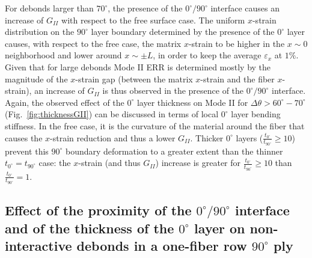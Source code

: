 \documentclass[review]{elsarticle}
\begin{document}
For debonds larger than $70^{\circ}$, the presence of the $0^{\circ}/90^{\circ}$ interface causes an increase of $G_{II}$ with respect to the free surface case. The uniform $x$-strain distribution on the $90^{\circ}$ layer boundary determined by the presence of the $0^{\circ}$ layer causes, with respect to the free case, the matrix $x$-strain to be higher in the $x\sim0$ neighborhood and lower around $x\sim\pm L$, in order to keep the average $\varepsilon_{x}$ at $1\%$. Given that for large debonds Mode II ERR is determined mostly by the magnitude of the $x$-strain gap (between the matrix $x$-strain and the fiber $x$-strain), an increase of $G_{II}$ is thus observed in the presence of the $0^{\circ}/90^{\circ}$ interface. Again, the observed effect of the $0^{\circ}$ layer thickness on Mode II for $\Delta\theta>60^{\circ}-70^{\circ}$ (Fig.~\ref{fig:thicknessGII}) can be discussed in terms of local $0^{\circ}$ layer bending stiffness. In the free case, it is the curvature of the material around the fiber that causes the $x$-strain reduction and thus a lower $G_{II}$. Thicker $0^{\circ}$ layers ($\frac{t_{0^{\circ}}}{t_{90^{\circ}}}\geq10$) prevent this $90^{\circ}$ boundary deformation to a greater extent than the thinner $t_{0^{\circ}}=t_{90^{\circ}}$ case: the $x$-strain (and thus $G_{II}$) increase is greater for $\frac{t_{0^{\circ}}}{t_{90^{\circ}}}\geq10$ than $\frac{t_{0^{\circ}}}{t_{90^{\circ}}}=1$.

\subsection{Effect of the proximity of the $0^{\circ}/90^{\circ}$ interface and of the thickness of the $0^{\circ}$ layer on non-interactive debonds in a one-fiber row $90^{\circ}$ ply}\label{subsec:debonddebondinter}
\end{document}
